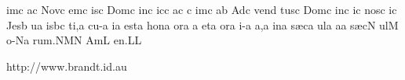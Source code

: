 \sgn {}im\punctum c\egn
\sgn {}a{}\punctum c\egn
\spatium
\sgn Nov\punctum c\egn
\sgn {}em\punctum c\egn
{}is\punctum c\egn
\spatium
\sgn Dom\punctum c\egn
\sgn {}in\punctum c\egn
\sgn {}ic\punctum c\egn
\sgn {}a{}\punctum c\egn
\spatium
\custos c\lineaproxima
{}im\punctum c\egn
\sgn {}a{}\punctum b\egn
\spatium
\sgn {}Ad\punctum c\egn
\sgn ven\punctum d\egn
\sgn tus\punctum c\egn
\spatium
\sgn Dom\punctum c\egn
\sgn {}in\punctum c\egn
\sgn {}i{}\punctum c\egn
\spatium
\sgn nos\punctum c\egn
{}i{}\punctum c\egn
\spatium
\sgn Jes\punctum b\egn
\sgn {}u{}\punctum a\egn
\spatium
{}is\pes bc\egn
\sgn ti,\punctum a\egn
\spatium
\divisiominima
\spatium
\sgn cu-\punctum a\egn
\sgn {}i{}\punctum a\egn
\spatium
\sgn {}e{st}\punctum a\egn
\spatium
\sgn hon\punctum a\egn
\sgn {}or\punctum a\egn
\spatium
\custos a\lineaproxima
\sgn {}et\punctum a\egn
\spatium
{}or\punctum a\egn
\sgn {}i-\punctum a\egn
\sgn {}a,\punctum a\egn
\spatium
\sgn {}in\punctum a\egn
\spatium
\sgn s{\ae}c\punctum a\egn
\sgn {}ul\punctum a\egn
\sgn {}a{}\punctum a\egn
\spatium
\sgn s{\ae}c\punctum N\egn
\sgn {}ul\punctum M\egn
\sgn {}o-\pes Na\egn
\sgn ru{m.}\clivis NM\augmentum N\egn
\spatium
\divisiomaior
\spatium
\sgn { }Am\punctum L\egn
\sgn {}e{n.}\punctum L\augmentum L\egn
\spatium
\Finisgregoriana

\vfill

\centerline{http://www.brandt.id.au}

\eject
\bye
